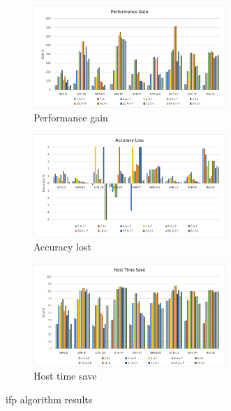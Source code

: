 \begin{figure}[H]
\centering
\begin{subfigure}{\textwidth}
    \centering
    \includegraphics[width=0.8\textwidth]{Images/Performance_ADA_INC_PC.png}
    \caption{ Performance gain}
    \label{fig:Performance_ADAINCPC}
\end{subfigure}
\begin{subfigure}{\textwidth}
    \centering
    \includegraphics[width=0.8\textwidth]{Images/Accuracy_ADA_INC_PC.png}
    \caption{ Accuracy lost}
    \label{fig:Accuracy_ADAINCPC}
\end{subfigure}
\begin{subfigure}{\textwidth}
    \centering
    \includegraphics[width=0.8\textwidth]{Images/Host_ADA_INC_PC.png}
    \caption{ Host time save}
    \label{fig:Host_ADAINCPC}
\end{subfigure}
        
\caption{\gls{ifp} algorithm results}
\label{fig:results_ADAINCPC}
\end{figure}


